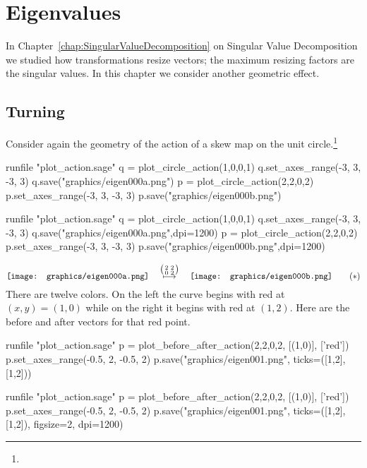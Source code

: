 \chapter{Eigenvalues}

In Chapter~\ref{chap:SingularValueDecomposition} on 
Singular Value Decomposition we studied how
transformations resize vectors; the maximum resizing factors
are the singular values.
In this chapter we consider another geometric effect.


\section{Turning}
Consider again the geometry of the action of a skew map on the unit 
circle.\footnote{\noterightmult}
\begin{sageoutput}
runfile "plot_action.sage"  
q = plot_circle_action(1,0,0,1) 
q.set_axes_range(-3, 3, -3, 3) 
q.save("graphics/eigen000a.png")
p = plot_circle_action(2,2,0,2) 
p.set_axes_range(-3, 3, -3, 3) 
p.save("graphics/eigen000b.png")
\end{sageoutput}
\begin{sagesilent}
runfile "plot_action.sage"  
q = plot_circle_action(1,0,0,1) 
q.set_axes_range(-3, 3, -3, 3) 
q.save("graphics/eigen000a.png",dpi=1200)
p = plot_circle_action(2,2,0,2) 
p.set_axes_range(-3, 3, -3, 3) 
p.save("graphics/eigen000b.png",dpi=1200)
\end{sagesilent}
\begin{equation*}
  \vcenteredhbox{\texttt{[image: graphics/eigen000a.png]}}
  \quad\mapsunder{\big (\begin{smallmatrix} 2 &2 \\ 0 &2 \end{smallmatrix}\big )}\quad
  \vcenteredhbox{\texttt{[image: graphics/eigen000b.png]}}
  \tag{$*$}
\end{equation*}
There are twelve colors.
On the left the curve begins with red at $(x,y)=(1,0)$
while on the right it begins with red at $(1,2)$.
Here are the before and after vectors for that red point.
\begin{sageoutput}[d,0,1;d,2,4]
runfile "plot_action.sage"  
p = plot_before_after_action(2,2,0,2, [(1,0)], ['red']) 
p.set_axes_range(-0.5, 2, -0.5, 2) 
p.save("graphics/eigen001.png", ticks=([1,2],[1,2]))
\end{sageoutput}
\begin{sagesilent}
runfile "plot_action.sage"  
p = plot_before_after_action(2,2,0,2, [(1,0)], ['red']) 
p.set_axes_range(-0.5, 2, -0.5, 2) 
p.save("graphics/eigen001.png", ticks=([1,2],[1,2]), figsize=2, dpi=1200)
\end{sagesilent}

